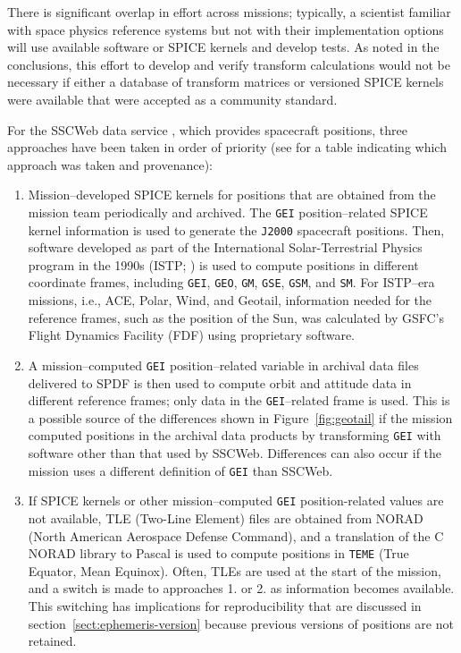 \documentclass[draft]{agujournal2019}
\begin{document}
There is significant overlap in effort across missions; typically, a scientist familiar with space physics reference systems but not with their implementation options will use available software or SPICE kernels and develop tests. As noted in the conclusions, this effort to develop and verify transform calculations would not be necessary if either a database of transform matrices or versioned SPICE kernels were available that were accepted as a community standard.

For the SSCWeb data service \cite{SSCWeb}, which provides spacecraft positions, three approaches have been taken in order of priority (see  for a table indicating which approach was taken and provenance):

\begin{enumerate}
    \parskip 0.1in 

    \item Mission--developed SPICE kernels for positions that are obtained from the mission team periodically and archived. The \texttt{GEI} position--related SPICE kernel information is used to generate the \texttt{J2000} spacecraft positions. Then, software developed as part of the International Solar-Terrestrial Physics program in the 1990s (ISTP; ) is used to compute positions in different coordinate frames, including \texttt{GEI}, \texttt{GEO}, \texttt{GM}, \texttt{GSE}, \texttt{GSM}, and \texttt{SM}. For ISTP--era missions, i.e., ACE, Polar, Wind, and Geotail, information needed for the reference frames, such as the position of the Sun, was calculated by GSFC's Flight Dynamics Facility (FDF) using proprietary software.

    \item A mission--computed \texttt{GEI} position--related variable in archival data files delivered to SPDF is then used to compute orbit and attitude data in different reference frames; only data in the \texttt{GEI}--related frame is used. This is a possible source of the differences shown in Figure~\ref{fig:geotail} if the mission computed positions in the archival data products by transforming \texttt{GEI} with software other than that used by SSCWeb. Differences can also occur if the mission uses a different definition of \texttt{GEI} than SSCWeb.

    \item If SPICE kernels or other mission--computed  \texttt{GEI} position-related values are not available, TLE (Two-Line Element) files are obtained from NORAD (North American Aerospace Defense Command), and a translation of the C NORAD library to Pascal \cite{NORADSGP4c} is used to compute positions in \texttt{TEME} (True Equator, Mean Equinox). Often, TLEs are used at the start of the mission, and a switch is made to approaches 1. or 2. as information becomes available. This switching has implications for reproducibility that are discussed in section~\ref{sect:ephemeris-version} because previous versions of positions are not retained.


\end{enumerate}
\end{document}
